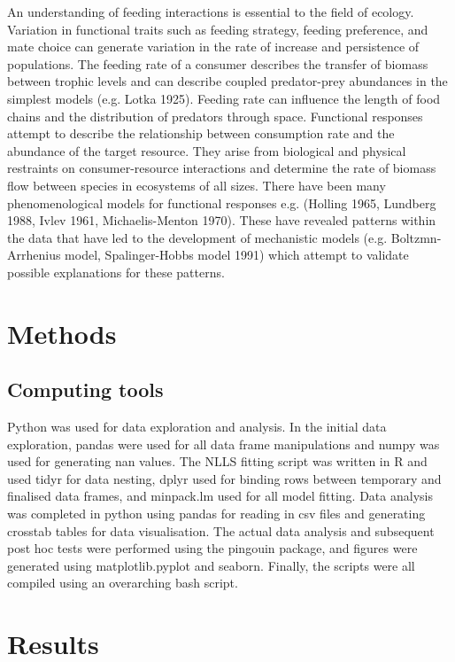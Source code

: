 \documentclass[11pt]{article}
\begin{document}
	An understanding of feeding interactions is essential to the field of ecology. Variation in functional traits such as feeding strategy, feeding preference, and mate choice can generate variation in the rate of increase and persistence of populations. The feeding rate of a consumer describes the transfer of biomass between trophic levels and can describe coupled predator-prey abundances in the simplest models (e.g. Lotka 1925). Feeding rate can influence the length of food chains and the distribution of predators through space. Functional responses attempt to describe the relationship between consumption rate and the abundance of the target resource. They arise from biological and physical restraints on consumer-resource interactions and determine the rate of biomass flow between species in ecosystems of all sizes. There have been many phenomenological models for functional responses e.g. (Holling 1965, Lundberg 1988, Ivlev 1961,  Michaelis-Menton 1970). These have revealed patterns within the data that have led to the development of mechanistic models (e.g. Boltzmn-Arrhenius model, Spalinger-Hobbs model 1991) which attempt to validate possible explanations for these patterns. \\
	
	
	\section*{Methods}
	
	
	
	\subsection*{Computing tools}
	
	Python was used for data exploration and analysis. In the initial data exploration, pandas were used for all data frame manipulations and numpy was used for generating nan values. The NLLS fitting script was written in R and used tidyr for data nesting, dplyr used for binding rows between temporary and finalised data frames, and minpack.lm used for all model fitting. Data analysis was completed in python using pandas for reading in csv files and generating crosstab tables for data visualisation. The actual data analysis and subsequent post hoc tests were performed using the pingouin package, and figures were generated using matplotlib.pyplot and seaborn. Finally, the scripts were all compiled using an overarching bash script. 
	
	
	\section*{Results}
	
\end{document}
